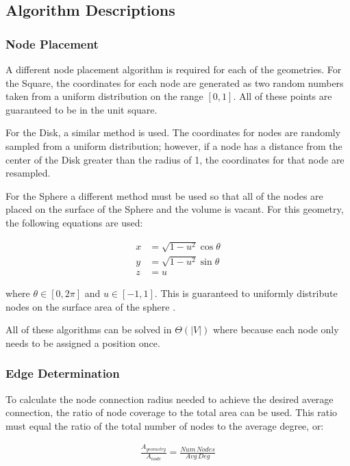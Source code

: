 \documentclass{article}
\begin{document}
    \subsection{Algorithm Descriptions}

        \subsubsection{Node Placement}
        A different node placement algorithm is required for each of the geometries. For the Square, the coordinates for each node are generated as two random numbers taken from a uniform distribution on the range $[0,1]$. All of these points are guaranteed to be in the unit square.
        \par
        For the Disk, a similar method is used. The coordinates for nodes are randomly sampled from a uniform distribution; however, if a node has a distance from the center of the Disk greater than the radius of 1, the coordinates for that node are resampled.
        \par
        For the Sphere a different method must be used so that all of the nodes are placed on the surface of the Sphere and the volume is vacant. For this geometry, the following equations are used:

        \begin{align}
            x &= \sqrt{1-u^2}\cos\theta \\
            y &= \sqrt{1-u^2}\sin\theta \\
            z &= u
        \end{align}

        where $\theta \in [0,2\pi]$ and $u \in [-1,1]$. This is guaranteed to uniformly distribute nodes on the surface area of the sphere \cite{spherepoints}.
        \par
        All of these algorithms can be solved in $\Theta\left(|V|\right)$ where because each node only needs to be assigned a position once.

        \subsubsection{Edge Determination}
        To calculate the node connection radius needed to achieve the desired average connection, the ratio of node coverage to the total area can be used. This ratio must equal the ratio of the total number of nodes to the average degree, or:

        \begin{align}
            \frac{A_{geometry}}{A_{node}}= \frac{Num\,Nodes}{Avg\,Deg}
        \end{align}
\end{document}
